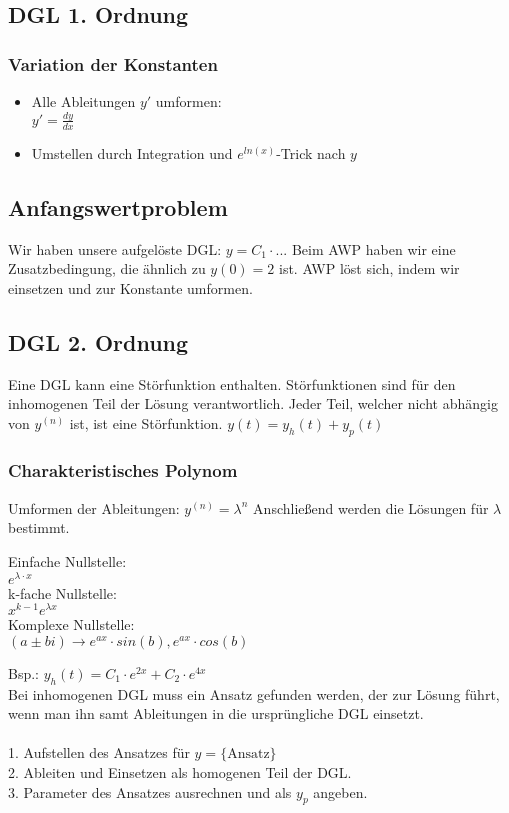 \documentclass[a4paper, 10pt, landscape]{article}
\begin{document}
\begin{multicols}{5}
\begin{small}
		\subsection{DGL 1. Ordnung}	
			\subsubsection{Variation der Konstanten}
				\begin{itemize}
					\item Alle Ableitungen $y'$ umformen: \\
					$y' = \frac{dy}{dx}$
					\item Umstellen durch Integration und $e^{ln(x)}$-Trick nach $y$
				\end{itemize}
			\subsection{Anfangswertproblem}
				Wir haben unsere aufgelöste DGL: $y = C_1 \cdot ...$
				Beim AWP haben wir eine Zusatzbedingung, die ähnlich zu $y(0) = 2$ ist. AWP löst sich, indem wir einsetzen und zur Konstante umformen.
		\subsection{DGL 2. Ordnung}	
			Eine DGL kann eine Störfunktion enthalten. Störfunktionen sind für den inhomogenen Teil der Lösung verantwortlich. Jeder Teil, welcher nicht abhängig von $y^{(n)}$ ist, ist eine Störfunktion. $y(t) = y_h(t) + y_p(t)$
			\subsubsection{Charakteristisches Polynom}
				Umformen der Ableitungen: $y^{(n)} = \lambda^n$
				Anschließend werden die Lösungen für $\lambda$ bestimmt.
				
				Einfache Nullstelle:\\
				$e^{\lambda \cdot x}$\\
				k-fache Nullstelle:\\
				$x^{k-1} e^{\lambda x}$\\
				Komplexe Nullstelle:\\
				$(a \pm bi) \rightarrow e^{ax} \cdot sin(b), e^{ax} \cdot cos(b)$
				
				Bsp.: $y_h(t) = C_1 \cdot e^{2x} + C_2 \cdot e^{4x}$\\
				Bei inhomogenen DGL muss ein Ansatz gefunden werden, der zur Lösung führt, wenn man ihn samt Ableitungen in die ursprüngliche DGL einsetzt.\\
				\\
				1. Aufstellen des Ansatzes für $y = \{ \text{Ansatz} \}$\\
				2. Ableiten und Einsetzen als homogenen Teil der DGL.\\
				3. Parameter des Ansatzes ausrechnen und als $y_p$ angeben.
\end{small}
\end{multicols}
\end{document}
